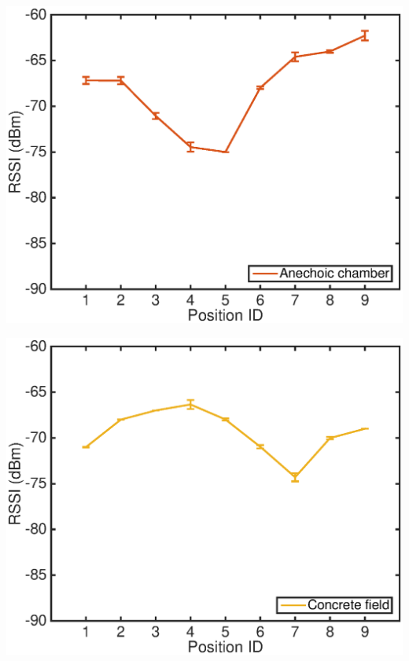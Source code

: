 \documentclass[11pt]{beamer}
\begin{document}
\begin{frame}
\includegraphics[width=\textwidth]{deep_fading_2530_plot_chamber.eps} 
\end{frame}

\begin{frame}
\includegraphics[width=\textwidth]{deep_fading_2530_plot_concrete_field.eps} 
\end{frame}
\end{document}

